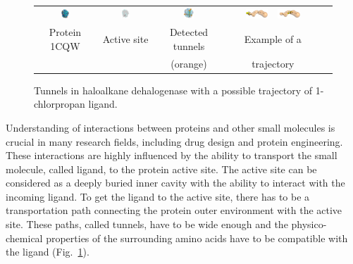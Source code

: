 \documentclass{svmult}
\begin{document}
\begin{figure}[b]
\centering
{\footnotesize
\renewcommand{\arraystretch}{0.1}
\renewcommand{\tabcolsep}{0pt}
\begin{tabular}{ccccc}
\includegraphics[width=0.15\textwidth]{fig/motiv1} &
\includegraphics[width=0.17\textwidth]{fig/motiv2lab} &
\includegraphics[width=0.16\textwidth]{fig/motiv3} &
\hbox{
\vbox{
\hbox{\includegraphics[width=0.25\textwidth]{fig/ta-1} }
\hbox{\includegraphics[width=0.25\textwidth]{fig/ta-433}}
} 
}
\\
Protein 1CQW & Active site & Detected tunnels & Example of a  \\
             &            & (orange)          & trajectory
\end{tabular}
}
\caption{\label{fig::motiv}
    Tunnels in haloalkane dehalogenase with a possible trajectory of 1-chlorpropan ligand.
}
\end{figure}

Understanding of interactions between proteins and other small molecules is crucial in many research fields, including drug design and protein engineering. 
These interactions are highly influenced by the ability to transport the small molecule, called ligand, to the protein active site.
The active site can be considered as a deeply buried inner cavity with the ability to interact with the incoming ligand.
To get the ligand to the active site, there has to be a transportation path connecting the protein outer environment with the active site.
These paths, called tunnels, have to be wide enough and the physico-chemical properties of the surrounding amino acids have to be compatible with the ligand (Fig.~\ref{fig::motiv}).
\end{document}
